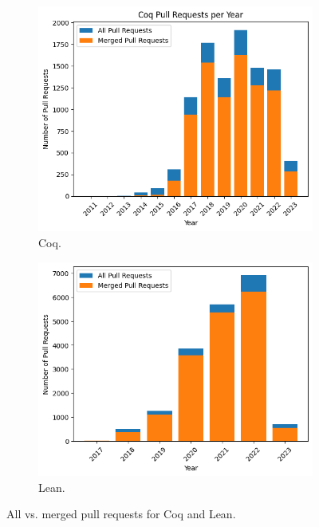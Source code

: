 \documentclass[sigconf,nonacm]{acmart}
\begin{document}
\begin{figure}[H]
\begin{subfigure}{0.8\columnwidth}
  \includegraphics[width=\linewidth]{coq_mergedvsall.png}
  \caption{Coq.}
  \label{fig:1}
\end{subfigure}
\hfill %
\begin{subfigure}{0.8\columnwidth}
  \includegraphics[width=\linewidth]{lean_mergedvsall.png}
  \caption{Lean.}
  \label{fig:2}
\end{subfigure}
\caption{All vs. merged pull requests for Coq and Lean.}
\label{bars}
\end{figure}
\end{document}
